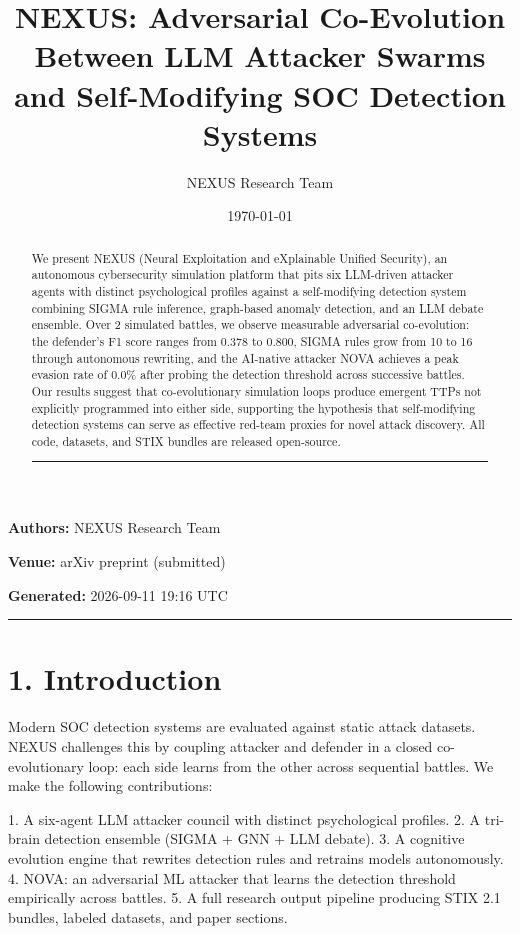 \documentclass{article}
\title{NEXUS: Adversarial Co-Evolution Between LLM Attacker Swarms and Self-Modifying SOC Detection Systems}
\author{NEXUS Research Team}
\date{\today}
\begin{document}
\maketitle


\textbf{Authors:} NEXUS Research Team  

\textbf{Venue:} arXiv preprint (submitted)  

\textbf{Generated:} 2026-09-11 19:16 UTC  

\hrule\vspace{6pt}

\begin{abstract}

We present NEXUS (Neural Exploitation and eXplainable Unified Security), an autonomous cybersecurity simulation platform that pits six LLM-driven attacker agents with distinct psychological profiles against a self-modifying detection system combining SIGMA rule inference, graph-based anomaly detection, and an LLM debate ensemble. Over 2 simulated battles, we observe measurable adversarial co-evolution: the defender's F1 score ranges from 0.378 to 0.800, SIGMA rules grow from 10 to 16 through autonomous rewriting, and the AI-native attacker NOVA achieves a peak evasion rate of 0.0\% after probing the detection threshold across successive battles. Our results suggest that co-evolutionary simulation loops produce emergent TTPs not explicitly programmed into either side, supporting the hypothesis that self-modifying detection systems can serve as effective red-team proxies for novel attack discovery. All code, datasets, and STIX bundles are released open-source.


\hrule\vspace{6pt}

\end{abstract}

\section{1. Introduction}

Modern SOC detection systems are evaluated against static attack datasets. NEXUS challenges this by coupling attacker and defender in a closed co-evolutionary loop: each side learns from the other across sequential battles. We make the following contributions:

1. A six-agent LLM attacker council with distinct psychological profiles.
2. A tri-brain detection ensemble (SIGMA + GNN + LLM debate).
3. A cognitive evolution engine that rewrites detection rules and retrains models autonomously.
4. NOVA: an adversarial ML attacker that learns the detection threshold empirically across battles.
5. A full research output pipeline producing STIX 2.1 bundles, labeled datasets, and paper sections.
\end{document}
